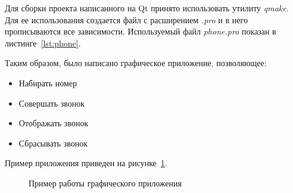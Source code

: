 Для сборки проекта написанного на Qt принято использовать утилиту \textit{qmake}. Для ее использования создается файл с расширением \textit{.pro} и в него прописываются все зависимости. Используемый файл \textit{phone.pro} показан в листинге~\ref{lst:phone}.

Таким образом, было написано графическое приложение, позволяющее:
\begin{itemize}
\item Набирать номер
\item Совершать звонок
\item Отображать звонок
\item Сбрасывать звонок
\end{itemize}
Пример приложения приведен на рисунке~\ref{fig:phone}.
\begin{figure}
\caption{Пример работы графического приложения}
\label{fig:phone}
\end{figure}
